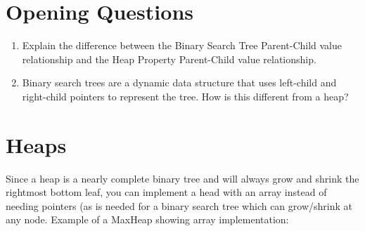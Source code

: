 \documentclass[12pt]{report}
\begin{document}
\section{Opening Questions}\label{sec:opening-questions}
\begin{enumerate}[label=\arabic*.]
    \item Explain the difference between the Binary Search Tree Parent-Child value relationship and the Heap Property Parent-Child value relationship. 
	\item Binary search trees are a dynamic data structure that uses left-child and right-child pointers to represent the tree. How is this different from a heap? 
\end{enumerate}

\section{Heaps}\label{sec:heaps}
\noindent Since a heap is a nearly complete binary tree and will always grow and shrink the rightmost bottom leaf, you can implement a head with an array instead of needing pointers (as is needed for a binary search tree which can grow/shrink at any node. Example of a MaxHeap showing array implementation:
\end{document}
